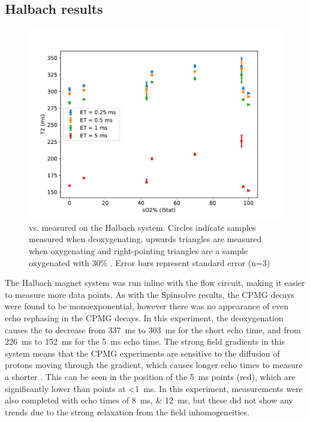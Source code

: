 \subsection{Halbach results}
\begin{figure}[h]
\centering
\includegraphics[width=\textwidth]{figures/stoppedflow/halbachT2SO2.pdf}
\caption[Stopped flow \Ttwo vs. \SOtwo measured on the Halbach system]{\Ttwo vs. \SOtwo measured on the Halbach system. Circles indicate samples measured when deoxygenating, upwards triangles are measured when oxygenating and right-pointing triangles are a sample oxygenated with 30\% \Otwo. Error bars represent standard error (n=3)}
\label{fig:sf-halbachT2SO2}
\end{figure}

The Halbach magnet system was run inline with the flow circuit, making it easier to measure more data points.
As with the Spinsolve results, the CPMG decays were found to be monoexponential, however there was no appearance of even echo rephasing in the CPMG decays.
In this experiment, the deoxygenation causes the \Ttwo to decrease from \SI{337}{ms} to \SI{303}{ms} for the short echo time, and from \SI{226}{ms} to \SI{152}{ms} for the \SI{5}{ms} echo time.
The strong field gradients in this system means that the CPMG experiments are sensitive to the diffusion of protons moving through the gradient, which causes longer echo times to measure a shorter \Ttwo.
This can be seen in the position of the \SI{5}{ms} points (red), which are significantly lower than points at \SI{<1}{ms}.
In this experiment, measurements were also completed with echo times of \SIlist{8;12}{ms}, but these did not show any trends due to the strong relaxation from the field inhomogeneities.

